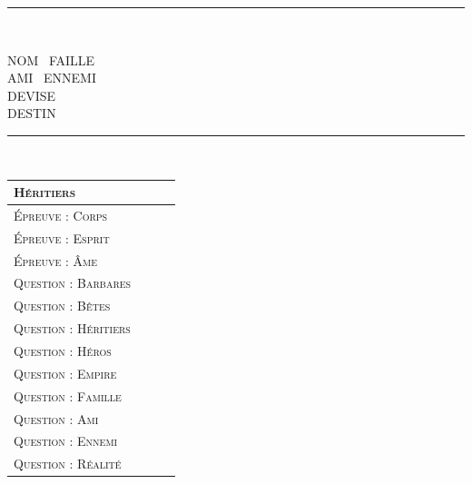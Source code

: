 \documentclass[12pt,twoside,a5paper]{article}
\begin{document}
\hrule~\\

\begin{minipage}[h]{0.05\textwidth}  \end{minipage} \hfill \begin{minipage}[h]{0.95\textwidth}
	NOM \hrulefill~FAILLE \hrulefill~\\
	AMI \hrulefill~ENNEMI \hrulefill~\\
	DEVISE \hrulefill~\\
	DESTIN \hrulefill~\Ovalbox{~} \Ovalbox{~} \Ovalbox{~} \Ovalbox{~} \Ovalbox{~}~\\
\end{minipage}

\hrule~\\

\begin{minipage}[h]{0.05\textwidth}  \end{minipage} \hfill \begin{minipage}[h]{0.95\textwidth}
	\begin{tabular}[c]{ p{}|p{}|p{}|p{}|}
		\textsc{Héritiers}				&					&					&					\\ \hline
		\textsc{Épreuve : Corps}		&					&					&					\\ \hline
		\textsc{Épreuve : Esprit}		&					&					&					\\ \hline
		\textsc{Épreuve : Âme}			&					&					&					\\ \hline
		\textsc{Question : Barbares}	&					&					&					\\ \hline
		\textsc{Question : Bêtes}		&					&					&					\\ \hline
		\textsc{Question : Héritiers}	&					&					&					\\ \hline
		\textsc{Question : Héros}		&					&					&					\\ \hline
		\textsc{Question : Empire}		&					&					&					\\ \hline
		\textsc{Question : Famille}		&					&					&					\\ \hline
		\textsc{Question : Ami}			&					&					&					\\ \hline
		\textsc{Question : Ennemi}		&					&					&					\\ \hline
		\textsc{Question : Réalité}		&					&					&					\\ \hline
	\end{tabular}~\\
\end{minipage}
\end{document}
